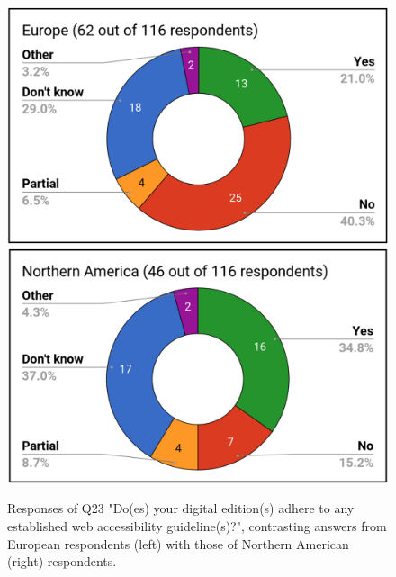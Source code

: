 \begin{paper}
\renewcommand*{\thefootnote}{\fnsymbol{footnote}}
\begin{figure}[p!]
\includegraphics[width=\textwidth]{media/martinez3a.png}\\
\includegraphics[width=\textwidth]{media/martinez3b.png}
\caption[Responses of Q23 "Do(es) your digital edition(s) adhere to any established web accessibility guideline(s)?", contrasting answers from European respondents (left) with those of
Northern American (right) respondents.]{Responses of Q23 "Do(es) your digital edition(s) adhere to any established web accessibility guideline(s)?", contrasting answers from European respondents (left) with those of
Northern American (right) respondents.}
\label{q23}
\end{figure}
\renewcommand*{\thefootnote}{\arabic{footnote}}


\end{paper}
